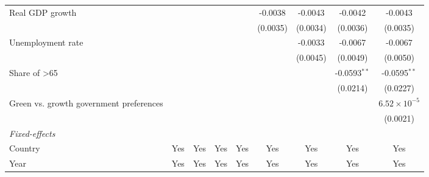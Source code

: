 \begin{table}[htbp]
\begin{tabular}{lcccccccc}
      Real GDP growth                                                                  &          &          &                 &                 & -0.0038         & -0.0043         & -0.0042         & -0.0043\\   
                                                                                       &          &          &                 &                 & (0.0035)        & (0.0034)        & (0.0036)        & (0.0035)\\   
      Unemployment rate                                                                &          &          &                 &                 &                 & -0.0033         & -0.0067         & -0.0067\\   
                                                                                       &          &          &                 &                 &                 & (0.0045)        & (0.0049)        & (0.0050)\\   
      Share of >65                                                                     &          &          &                 &                 &                 &                 & -0.0593$^{**}$  & -0.0595$^{**}$\\   
                                                                                       &          &          &                 &                 &                 &                 & (0.0214)        & (0.0227)\\   
      Green vs. growth government preferences                                          &          &          &                 &                 &                 &                 &                 & $6.52\times 10^{-5}$\\    
                                                                                       &          &          &                 &                 &                 &                 &                 & (0.0021)\\   
      \midrule
      \emph{Fixed-effects}\\
      Country                                                                          & Yes      & Yes      & Yes             & Yes             & Yes             & Yes             & Yes             & Yes\\  
      Year                                                                             & Yes      & Yes      & Yes             & Yes             & Yes             & Yes             & Yes             & Yes\\  

\end{tabular}
\end{table}
